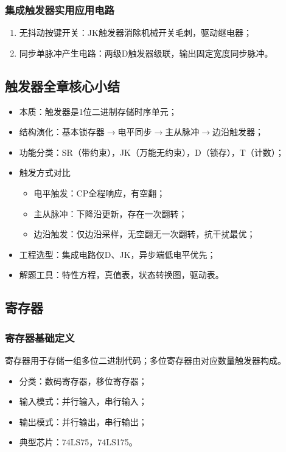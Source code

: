 \subsubsection{集成触发器实用应用电路}
\begin{enumerate}
    \item 无抖动按键开关：JK触发器消除机械开关毛刺，驱动继电器；
    \item 同步单脉冲产生电路：两级D触发器级联，输出固定宽度同步脉冲。
\end{enumerate}

\subsection{触发器全章核心小结}
\begin{itemize}
    \item 本质：触发器是1位二进制存储时序单元；
    \item 结构演化：基本锁存器$\rightarrow$电平同步$\rightarrow$主从脉冲$\rightarrow$边沿触发器；
    \item 功能分类：SR（带约束），JK（万能无约束），D（锁存），T（计数）；
    \item 触发方式对比
    \begin{itemize}
        \item 电平触发：CP全程响应，有空翻；
        \item 主从脉冲：下降沿更新，存在一次翻转；
        \item 边沿触发：仅边沿采样，无空翻无一次翻转，抗干扰最优；
    \end{itemize}
    \item 工程选型：集成电路仅D、JK，异步端低电平优先；
    \item 解题工具：特性方程，真值表，状态转换图，驱动表。
\end{itemize}

\subsection{寄存器}
\subsubsection{寄存器基础定义}
寄存器用于存储一组多位二进制代码；多位寄存器由对应数量触发器构成。
\begin{itemize}
    \item 分类：数码寄存器，移位寄存器；
    \item 输入模式：并行输入，串行输入；
    \item 输出模式：并行输出，串行输出；
    \item 典型芯片：74LS75，74LS175。
\end{itemize}


